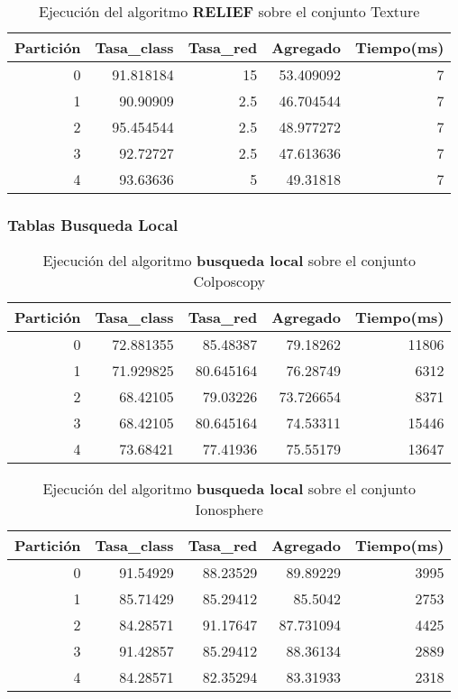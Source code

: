 \documentclass[size=a4, parskip=half, titlepage=false, toc=flat, toc=bib, 12pt]{scrartcl}
\begin{document}
 \begin{table}[ht]
  \centering
  \begin{tabular}[t]{rrrrr}
  \toprule
  Partición &Tasa\_class &Tasa\_red & Agregado & Tiempo(ms)\\
  \midrule
0         & 91.818184 & 15       & 53.409092 & 7      \\
1         & 90.90909  & 2.5      & 46.704544 & 7      \\
2         & 95.454544 & 2.5      & 48.977272 & 7      \\
3         & 92.72727  & 2.5      & 47.613636 & 7      \\
4         & 93.63636  & 5        & 49.31818  & 7      \\
  \bottomrule
  \end{tabular}
  \caption{Ejecución del algoritmo \textbf{RELIEF} sobre el conjunto Texture}

  \end{table}%

\newpage

\subsubsection{Tablas Busqueda Local}

 \begin{table}[ht]
  \centering
  \begin{tabular}[t]{rrrrr}
  \toprule
  Partición &Tasa\_class &Tasa\_red & Agregado & Tiempo(ms)\\
  \midrule
0         & 72.881355 & 85.48387  & 79.18262  & 11806  \\
1         & 71.929825 & 80.645164 & 76.28749  & 6312   \\
2         & 68.42105  & 79.03226  & 73.726654 & 8371   \\
3         & 68.42105  & 80.645164 & 74.53311  & 15446  \\
4         & 73.68421  & 77.41936  & 75.55179  & 13647  \\
  \bottomrule
  \end{tabular}
  \caption{Ejecución del algoritmo \textbf{busqueda local} sobre el conjunto Colposcopy }
  \end{table}%

 \begin{table}[ht]
  \centering
  \begin{tabular}[t]{rrrrr}
  \toprule
  Partición &Tasa\_class &Tasa\_red & Agregado & Tiempo(ms)\\
  \midrule
0         & 91.54929  & 88.23529 & 89.89229  & 3995   \\
1         & 85.71429  & 85.29412 & 85.5042   & 2753   \\
2         & 84.28571  & 91.17647 & 87.731094 & 4425   \\
3         & 91.42857  & 85.29412 & 88.36134  & 2889   \\
4         & 84.28571  & 82.35294 & 83.31933  & 2318   \\
  \bottomrule
  \end{tabular}
  \caption{Ejecución del algoritmo \textbf{busqueda local} sobre el conjunto Ionosphere}
  \end{table}%
\end{document}
